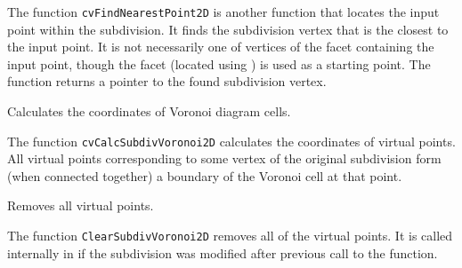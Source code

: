 
\begin{description}
\end{description}

The function \texttt{cvFindNearestPoint2D} is another function that
locates the input point within the subdivision. It finds the subdivision vertex that
is the closest to the input point. It is not necessarily one of vertices
of the facet containing the input point, though the facet (located using
) is used as a starting
point. The function returns a pointer to the found subdivision vertex.

\label{CalcSubdivVoronoi2D}

Calculates the coordinates of Voronoi diagram cells.


\begin{description}
\end{description}

The function \texttt{cvCalcSubdivVoronoi2D} calculates the coordinates
of virtual points. All virtual points corresponding to some vertex of the
original subdivision form (when connected together) a boundary of the Voronoi
cell at that point.

\label{ClearSubdivVoronoi2D}

Removes all virtual points.


\begin{description}
\end{description}

The function \texttt{ClearSubdivVoronoi2D} removes all of the virtual points. It
is called internally in  if the subdivision
was modified after previous call to the function.

